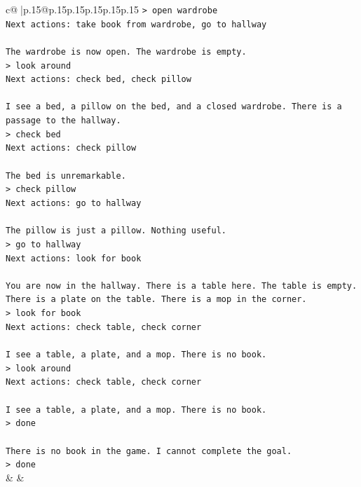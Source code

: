 \documentclass{article}
\begin{document}
{\begin{supertabular}{c@{$\;$}|p{.15\linewidth}@{}p{.15\linewidth}p{.15\linewidth}p{.15\linewidth}p{.15\linewidth}p{.15\linewidth}}
{{{\texttt{> open wardrobe  } \\
\texttt{Next actions: take book from wardrobe, go to hallway} \\
\\ 
\texttt{The wardrobe is now open. The wardrobe is empty.  } \\
\texttt{> look around  } \\
\texttt{Next actions: check bed, check pillow} \\
\\ 
\texttt{I see a bed, a pillow on the bed, and a closed wardrobe. There is a passage to the hallway.  } \\
\texttt{> check bed  } \\
\texttt{Next actions: check pillow} \\
\\ 
\texttt{The bed is unremarkable.  } \\
\texttt{> check pillow  } \\
\texttt{Next actions: go to hallway} \\
\\ 
\texttt{The pillow is just a pillow. Nothing useful.  } \\
\texttt{> go to hallway  } \\
\texttt{Next actions: look for book} \\
\\ 
\texttt{You are now in the hallway. There is a table here. The table is empty. There is a plate on the table. There is a mop in the corner.  } \\
\texttt{> look for book  } \\
\texttt{Next actions: check table, check corner} \\
\\ 
\texttt{I see a table, a plate, and a mop. There is no book.  } \\
\texttt{> look around  } \\
\texttt{Next actions: check table, check corner} \\
\\ 
\texttt{I see a table, a plate, and a mop. There is no book.  } \\
\texttt{> done} \\
\\ 
\texttt{There is no book in the game. I cannot complete the goal.  } \\
\texttt{> done} \\
            }
        }
    }
    & & \\ \\


\end{supertabular}}
\end{document}
